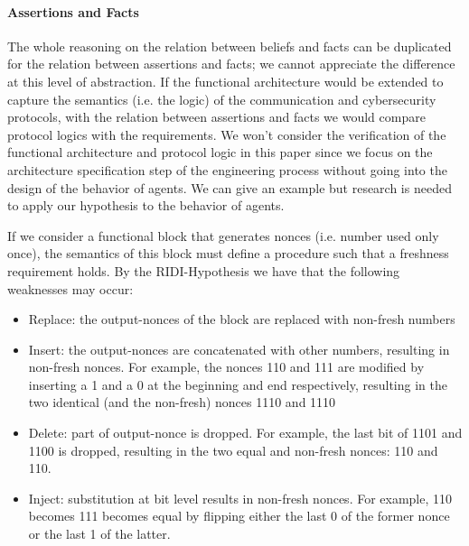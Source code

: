 \documentclass[conference]{IEEEtran}
\begin{document}
\paragraph{Assertions and Facts}
The whole reasoning on the relation between beliefs and facts can be duplicated
for the relation between assertions and facts; we cannot appreciate the
difference at this level of abstraction.  If the functional architecture would
be extended to capture the semantics (i.e. the logic) of the communication and
cybersecurity protocols, with the relation between assertions and facts we would
compare protocol logics with the requirements. We won't consider the verification of
the functional architecture and protocol logic in this paper since we
focus on the architecture specification step of the engineering process
without going into the design of the behavior of agents. We can give an example
but research is needed to apply our hypothesis
to the behavior of agents. 

If we consider a functional block that generates nonces (i.e. number used
only once), the semantics of this block must define a procedure such that 
a freshness requirement holds. By the RIDI-Hypothesis we have that
the following weaknesses may occur:
\begin{itemize}
	\item Replace: the output-nonces of the block are replaced with
		non-fresh numbers
	\item Insert: the output-nonces are concatenated with other numbers,
		resulting in non-fresh nonces. For example, the nonces 110 and
		111 are modified by inserting a 1 and a 0 at the beginning and
		end respectively, resulting in the two identical (and the
		non-fresh) nonces 1110 and 1110
	\item Delete: part of output-nonce is dropped. For example, the last bit of 1101 and 1100 is dropped, resulting in the two equal and non-fresh nonces: 110 and 110.
	\item Inject: substitution at bit level results in non-fresh nonces. For example, 110 becomes 111 becomes equal by flipping either the last 0 of the former nonce or the last 1 of the latter.
\end{itemize}
\end{document}
